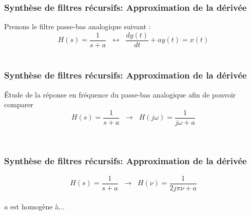 \documentclass{beamer}
\begin{document}
\begin{frame}
\frametitle{Synthèse de filtres récursifs: Approximation de la dérivée}
Prenons le filtre passe-bas analogique suivant  :
\[ H(s) = \frac{1}{s+a} \; \;  \leftrightarrow \; \; \frac{dy(t)}{dt} + ay(t) = x(t) \]\\


\end{frame}

\begin{frame}
\frametitle{Synthèse de filtres récursifs: Approximation de la dérivée}

\'Etude de la réponse en fréquence du passe-bas analogique afin de pouvoir comparer\\
\vspace{0.5cm}
\[H(s) = \frac{1}{s+a} \; \;  \rightarrow \; \; H(j\omega) = \frac{1}{j\omega + a}\]\\
\vspace{0.5cm}

\begin{columns}
\column{60mm}


\column{60mm}


\end{columns}
\vspace{1cm}
\end{frame}

\begin{frame}
\frametitle{Synthèse de filtres récursifs: Approximation de la dérivée}
\[H(s) = \frac{1}{s+a} \; \;  \rightarrow \; \; H(\nu) = \frac{1}{2j\pi \nu + a}\]\\
\vspace{0.5 cm}
$a$ est homogène à...  \\
\vspace{0.5 cm}

\end{frame}
\end{document}
